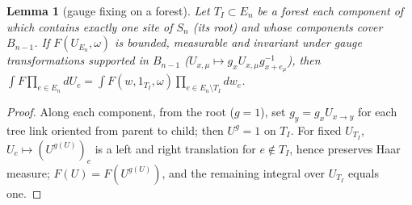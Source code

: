 \documentclass[11pt,a4paper]{article}
\theoremstyle{plain}
\newtheorem{lemma}[theorem]{Lemma}
\theoremstyle{definition}
\theoremstyle{remark}
\numberwithin{equation}{section}
\begin{document}
\begin{lemma}[gauge fixing on a forest]\label{lem:G}
Let $T_I\subset E_n$ be a forest each component of which contains exactly one site of $S_n$ (its root) and whose components cover
$B_{n-1}$. If $F(U_{E_n},\omega)$ is bounded, measurable and invariant under gauge transformations supported in $B_{n-1}$
($U_{x,\mu}\mapsto g_xU_{x,\mu}g_{x+e_\mu}^{-1}$), then $\int F\prod_{e\in E_n}dU_e=\int F(w,1_{T_I},\omega)\prod_{e\in E_n\setminus T_I}dw_e$.
\end{lemma}
\begin{proof}
Along each component, from the root ($g=1$), set $g_y=g_xU_{x\to y}$ for each tree link oriented from parent to child; then
$U^g=1$ on $T_I$. For fixed $U_{T_I}$, $U_e\mapsto(U^{g(U)})_e$ is a left and right translation for $e\notin T_I$, hence preserves Haar
measure; $F(U)=F(U^{g(U)})$, and the remaining integral over $U_{T_I}$ equals one.
\end{proof}
\end{document}
